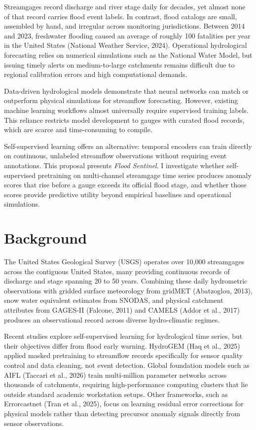 \documentclass[12pt]{report}
\begin{document}
Streamgages record discharge and river stage daily for decades, yet almost none of that record carries flood event labels. In contrast, flood catalogs are small, assembled by hand, and irregular across monitoring jurisdictions. Between 2014 and 2023, freshwater flooding caused an average of roughly 100 fatalities per year in the United States (National Weather Service, 2024). Operational hydrological forecasting relies on numerical simulations such as the National Water Model, but issuing timely alerts on medium-to-large catchments remains difficult due to regional calibration errors and high computational demands.

Data-driven hydrological models demonstrate that neural networks can match or outperform physical simulations for streamflow forecasting. However, existing machine learning workflows almost universally require supervised training labels. This reliance restricts model development to gauges with curated flood records, which are scarce and time-consuming to compile.

Self-supervised learning offers an alternative: temporal encoders can train directly on continuous, unlabeled streamflow observations without requiring event annotations. This proposal presents \textit{Flood Sentinel}. I investigate whether self-supervised pretraining on multi-channel streamgage time series produces anomaly scores that rise before a gauge exceeds its official flood stage, and whether those scores provide predictive utility beyond empirical baselines and operational simulations.

\section{Background}

The United States Geological Survey (USGS) operates over 10,000 streamgages across the contiguous United States, many providing continuous records of discharge and stage spanning 20 to 50 years. Combining these daily hydrometric observations with gridded surface meteorology from gridMET (Abatzoglou, 2013), snow water equivalent estimates from SNODAS, and physical catchment attributes from GAGES-II (Falcone, 2011) and CAMELS (Addor et al., 2017) produces an observational record across diverse hydro-climatic regimes.

Recent studies explore self-supervised learning for hydrological time series, but their objectives differ from flood early warning. HydroGEM (Haq et al., 2025) applied masked pretraining to streamflow records specifically for sensor quality control and data cleaning, not event detection. Global foundation models such as AIFL (Taccari et al., 2026) train multi-million parameter networks across thousands of catchments, requiring high-performance computing clusters that lie outside standard academic workstation setups. Other frameworks, such as Errorcastnet (Tran et al., 2025), focus on learning residual error corrections for physical models rather than detecting precursor anomaly signals directly from sensor observations.
\end{document}
